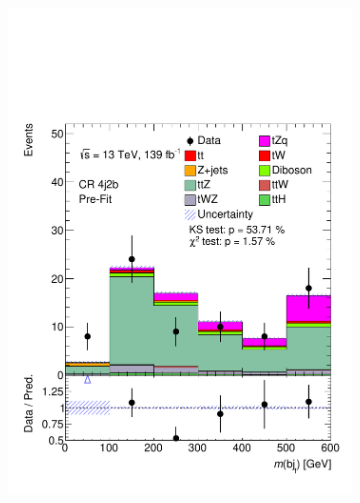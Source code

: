 \begin{figure}[!h] 
  \begin{subfigure}[b]{0.32\linewidth}
    \centering
    \includegraphics[width=\linewidth]{ubonn-thesis/Chapters/Chapters_06/Figure/Input_distribution/CR_4j2b_M_bj.pdf} 
  \end{subfigure}%
  \begin{subfigure}[b]{0.32\linewidth}
    \centering

\end{subfigure}
\end{figure}
